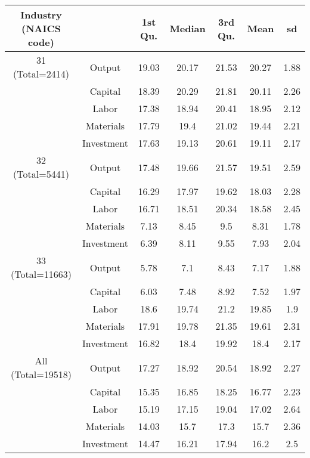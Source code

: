 \begin{table}[H]
\centering
\begin{tabular}{ccccccc}
  \hline\hline Industry (NAICS code) &   & 1st Qu. & Median & 3rd Qu. & Mean & sd \\ 
  \hline
31 (Total=2414) & Output & 19.03 & 20.17 & 21.53 & 20.27 & 1.88 \\ 
   & Capital & 18.39 & 20.29 & 21.81 & 20.11 & 2.26 \\ 
   & Labor & 17.38 & 18.94 & 20.41 & 18.95 & 2.12 \\ 
   & Materials & 17.79 & 19.4 & 21.02 & 19.44 & 2.21 \\ 
   & Investment & 17.63 & 19.13 & 20.61 & 19.11 & 2.17 \\ 
  32 (Total=5441) & Output & 17.48 & 19.66 & 21.57 & 19.51 & 2.59 \\ 
   & Capital & 16.29 & 17.97 & 19.62 & 18.03 & 2.28 \\ 
   & Labor & 16.71 & 18.51 & 20.34 & 18.58 & 2.45 \\ 
   & Materials & 7.13 & 8.45 & 9.5 & 8.31 & 1.78 \\ 
   & Investment & 6.39 & 8.11 & 9.55 & 7.93 & 2.04 \\ 
  33 (Total=11663) & Output & 5.78 & 7.1 & 8.43 & 7.17 & 1.88 \\ 
   & Capital & 6.03 & 7.48 & 8.92 & 7.52 & 1.97 \\ 
   & Labor & 18.6 & 19.74 & 21.2 & 19.85 & 1.9 \\ 
   & Materials & 17.91 & 19.78 & 21.35 & 19.61 & 2.31 \\ 
   & Investment & 16.82 & 18.4 & 19.92 & 18.4 & 2.17 \\ 
  All (Total=19518) & Output & 17.27 & 18.92 & 20.54 & 18.92 & 2.27 \\ 
   & Capital & 15.35 & 16.85 & 18.25 & 16.77 & 2.23 \\ 
   & Labor & 15.19 & 17.15 & 19.04 & 17.02 & 2.64 \\ 
   & Materials & 14.03 & 15.7 & 17.3 & 15.7 & 2.36 \\ 
   & Investment & 14.47 & 16.21 & 17.94 & 16.2 & 2.5 \\ 
   \hline
\end{tabular}
\end{table}
